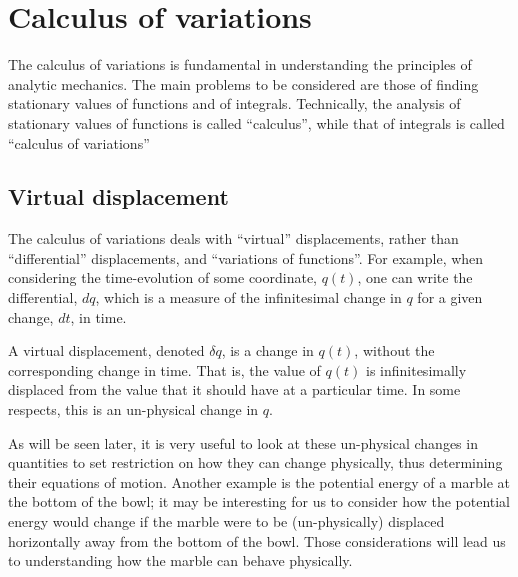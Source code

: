 \chapter{Calculus of variations}
\label{chap:CalculusVariation}
The calculus of variations is fundamental in understanding the principles of analytic mechanics. The main problems to be considered are those of finding stationary values of functions and of integrals. Technically, the analysis of stationary values of functions is called ``calculus'', while that of integrals is called ``calculus of variations''

\section{Virtual displacement}
The calculus of variations deals with ``virtual'' displacements, rather than ``differential'' displacements, and ``variations of functions''. For example, when considering the time-evolution of some coordinate, $q(t)$, one can  write the differential, $dq$, which is a measure of the infinitesimal change in $q$ for a given change, $dt$, in time. 

A virtual displacement, denoted $\delta q$, is a change in $q(t)$, without the corresponding change in time. That is, the value of $q(t)$ is infinitesimally displaced from the value that it should have at a particular time. In some respects, this is an un-physical change in $q$.

As will be seen later, it is very useful to look at these un-physical changes in quantities to set restriction on how they can change physically, thus determining their equations of motion. Another example is the potential energy of a marble at the bottom of the bowl; it may be interesting for us to consider how the potential energy would change if the marble were to be (un-physically) displaced horizontally away from the bottom of the bowl. Those considerations will lead us to understanding how the marble can behave physically.

